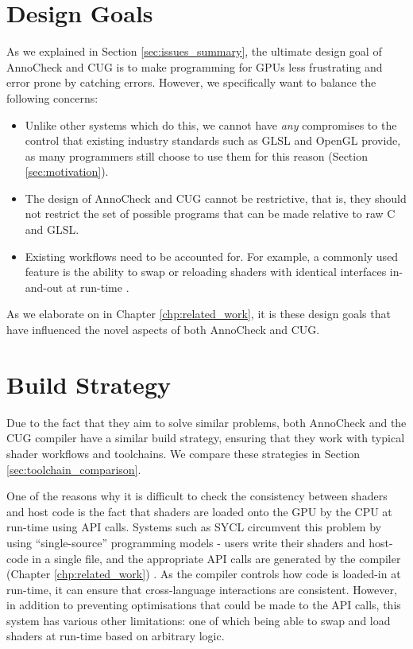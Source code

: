 \documentclass[a4paper,12pt,twoside,openright]{report}
\begin{document}
\section{Design Goals}

As we explained in Section \ref{sec:issues_summary}, the ultimate design goal
of AnnoCheck and CUG is to make programming for GPUs less frustrating and error
prone by catching errors. However, we specifically want to balance the
following concerns:

\begin{itemize}

    \item Unlike other systems which do this, we cannot have \textit{any}
    compromises to the control that existing industry standards such as GLSL
    and OpenGL provide, as many programmers still choose to use them for this
    reason (Section \ref{sec:motivation}).

    \item The design of AnnoCheck and CUG cannot be restrictive, that is, they
    should not restrict the set of possible programs that can be made relative
    to raw C and GLSL.

    \item Existing workflows need to be accounted for. For example, a commonly
    used feature is the ability to swap or reloading shaders with identical
    interfaces in-and-out at run-time \cite{HotloadShader}.

\end{itemize}

As we elaborate on in Chapter \ref{chp:related_work}, it is these design goals
that have influenced the novel aspects of both AnnoCheck and CUG.

\section{Build Strategy}

\label{sec:build_strategy}

Due to the fact that they aim to solve similar problems, both AnnoCheck and the
CUG compiler have a similar build strategy, ensuring that they work with
typical shader workflows and toolchains. We compare these strategies in Section
\ref{sec:toolchain_comparison}.

One of the reasons why it is difficult to check the consistency between shaders
and host code is the fact that shaders are loaded onto the GPU by the CPU at
run-time using API calls. Systems such as SYCL circumvent this problem by using
``single-source'' programming models - users write their shaders and host-code
in a single file, and the appropriate API calls are generated by the compiler
(Chapter \ref{chp:related_work}) \cite{SYCL}. As the compiler controls how code
is loaded-in at run-time, it can ensure that cross-language interactions are
consistent. However, in addition to preventing optimisations that could be made
to the API calls, this system has various other limitations: one of which being
able to swap and load shaders at run-time based on arbitrary logic.
\end{document}
